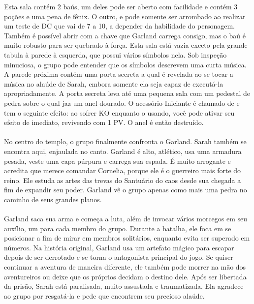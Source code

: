 %
\ofpar
%
 Esta sala contém 2 baús, um deles pode ser aberto com facilidade e contém 3 poções e uma pena de fênix. 
O outro,  e pode somente ser arrombado ao realizar um teste de DC que vai de 7 a 10, a depender da habilidade do personagem.
Também é possível abrir com a chave que Garland carrega consigo, mas o baú é muito robusto para ser quebrado à força.
%
\ofpar
%
 Esta sala está vazia exceto pela grande tabula à parede à esquerda, que possui vários símbolos nela. 
Sob inspeção minuciosa, o grupo pode entender que os símbolos descrevem uma curta música.
A parede próxima contém uma porta secreta a qual é revelada ao se tocar a música no alaúde de Sarah, embora somente ela seja capaz de executá-la apropriadamente.
A porta secreta leva até uma pequena sala com um pedestal de pedra sobre o qual jaz um anel dourado.
O acessório Iniciante é chamado de  e tem o seguinte efeito: ao sofrer KO enquanto o usando, você pode ativar seu efeito de imediato, revivendo com 1 PV. O anel é então destruído.
%
\clearpage
%
\\\\
%
 No centro do templo, o grupo finalmente confronta o Garland. 
Sarah também se encontra aqui, enjaulada no canto. Garland é alto, atlético, usa uma armadura pesada, veste uma capa púrpura e carrega sua espada.
É muito arrogante e acredita que merece comandar Cornelia, porque ele é o guerreiro mais forte do reino.
Ele estuda as artes das trevas do Santuário do caos desde sua chegada a fim de expandir seu poder.
Garland vê o grupo apenas como mais uma pedra no caminho de seus grandes planos.
%
\vfill
%
\\\\
%
Garland saca sua arma e começa a luta, além de invocar vários morcegos em seu auxílio, um para cada membro do grupo.
Durante a batalha, ele foca em se posicionar a fim de mirar em membros solitários, enquanto evita ser superado em números.
Na história original, Garland usa um artefato mágico para escapar depois de ser derrotado e se torna o antagonista principal do jogo.
Se quiser continuar a aventura de maneira diferente, ele também pode morrer na mão dos aventureiros ou deixe que os próprios decidam o destino dele.
Após ser libertada da prisão, Sarah está paralisada, muito assustada e traumatizada.
Ela agradece ao grupo por resgatá-la e pede que encontrem seu precioso alaúde. 
